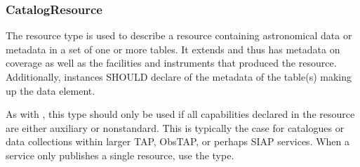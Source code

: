 \documentclass[11pt,a4paper]{ivoa}
\begin{document}
\subsubsection{CatalogResource}
\label{sect:CatalogResource}


The  resource type is used to describe a
resource containing astronomical data or metadata in a set of one or
more tables.  It extends  and thus has metadata
on coverage as well as the facilities and instruments that produced the
resource.  Additionally,  instances SHOULD
declare of the metadata of the table(s) making up the data
 element.

As with , this type should only be used if all
capabilities declared in the resource are either auxiliary or
nonstandard.  This is typically the case for catalogues or data
collections within larger TAP, ObsTAP, or perhaps SIAP services.  When
a service only publishes a single resource, use the
 type.
\end{document}
